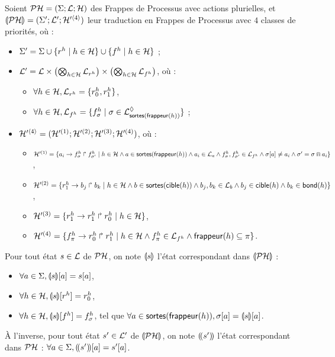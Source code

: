 \begin{definition}
  Soient $\mathcal{PH} = (\Sigma; \mathcal{L}; \mathcal{H})$ des Frappes de Processus avec actions plurielles,
  et $\llparenthesis \mathcal{PH} \rrparenthesis = (\Sigma'; \mathcal{L}'; \mathcal{H}'^{\langle 4 \rangle})$
  leur traduction en Frappes de Processus avec $4$ classes de priorités, où :
  \begin{itemize}
    \item $\Sigma' = \Sigma \cup \{ r^{h} \mid h \in \mathcal{H} \} \cup \{ f^{h} \mid h \in \mathcal{H} \}$ ;
    \item $\mathcal{L}' = \mathcal{L} \times \left( \bigotimes_{h \in \mathcal{H}} \mathcal{L}_{r^{h}} \right)
      \times \left( \bigotimes_{h \in \mathcal{H}} \mathcal{L}_{f^{h}} \right)$, où :
      \begin{itemize}
        \item $\forall h \in \mathcal{H}, \mathcal{L}_{r^{h}} = \{ r^{h}_0 , r^{h}_1 \}$,
        \item $\forall h \in \mathcal{H}, \mathcal{L}_{f^{h}} = \{ f^{h}_\sigma \mid
          \sigma \in \mathcal{L}^\lozenge_{\mathsf{sortes}(\mathsf{frappeur}(h))} \}$ ;
      \end{itemize}
    \item $\mathcal{H}'^{\langle 4 \rangle} = ( \mathcal{H}'^{(1)} ; \mathcal{H}'^{(2)} ; \mathcal{H}'^{(3)} ; \mathcal{H}'^{(4)} )$,
      où :
      \begin{itemize}
        \item $\mathcal{H}'^{(1)} = \{ a_i\rightarrow f^{h}_\sigma\Rsh f^{h}_{\sigma'} \mid
          h \in \mathcal{H} \wedge a \in \mathsf{sortes}(\mathsf{frappeur}(h)) \wedge a_i \in \mathcal{L}_a \wedge
          f^{h}_\sigma , f^{h}_{\sigma'} \in \mathcal{L}_{f^{h}} \wedge
          {\sigma[a]} \neq a_i \wedge \sigma' = \sigma \Cap a_i \}$,
        \item $\mathcal{H}'^{(2)} = \{ r^{h}_1\rightarrow b_j\Rsh b_k \mid
          h \in \mathcal{H} \wedge b \in \mathsf{sortes}(\mathsf{cible}(h)) \wedge b_j, b_k \in \mathcal{L}_b \wedge
          b_j \in \mathsf{cible}(h) \wedge b_k \in \mathsf{bond}(h) \}$,
        \item $\mathcal{H}'^{(3)} = \{ r^{h}_1\rightarrow r^{h}_1\Rsh r^{h}_0 \mid h \in \mathcal{H} \}$,
        \item $\mathcal{H}'^{(4)} = \{ f^{h}_\pi\rightarrow r^{h}_0\Rsh r^{h}_1 \mid
          h \in \mathcal{H} \wedge f^{h}_{\pi} \in \mathcal{L}_{f^{h}} \wedge
          \mathsf{frappeur}(h) \subseteq \pi \}$.
      \end{itemize}
  \end{itemize}
  Pour tout état $s \in \mathcal{L}$ de $\mathcal{PH}$,
  on note $\llparenthesis s \rrparenthesis$ l'état correspondant dans $\llparenthesis \mathcal{PH} \rrparenthesis$ :
  \begin{itemize}
    \item $\forall a \in \Sigma, {\llparenthesis s \rrparenthesis[a]} = {s[a]}$,
    \item $\forall h \in \mathcal{H}, {\llparenthesis s \rrparenthesis[r^{h}]} = r^{h}_0$,
    \item $\forall h \in \mathcal{H}, {\llparenthesis s \rrparenthesis[f^{h}]} = f^{h}_\sigma$,
      tel que $\forall a \in \mathsf{sortes}(\mathsf{frappeur}(h)), {\sigma[a]} = {\llparenthesis s \rrparenthesis[a]}$.
  \end{itemize}
  À l'inverse, pour tout état $s' \in \mathcal{L}'$ de $\llparenthesis \mathcal{PH} \rrparenthesis$,
  on note $(\!(s')\!)$ l'état correspondant dans $\mathcal{PH}$ :
  $\forall a \in \Sigma, {(\!(s')\!)[a]} = {s'[a]}$.
\end{definition}

